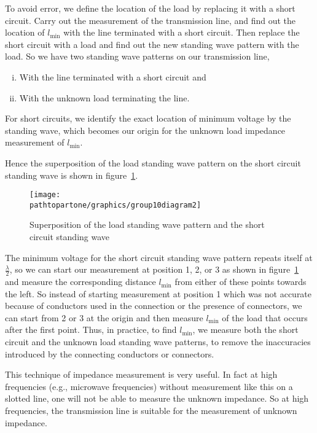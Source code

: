 To avoid error, we define the location of the load by replacing it with a short circuit. Carry out the measurement of the transmission line, and find out the location of $l_\min$ with the line terminated with a short circuit. Then replace the short circuit with a load and find out the new standing wave pattern with the load. So we have two standing wave patterns on our transmission line,
\begin{enumerate}[(i)]
\item With the line terminated with a short circuit and 
\item With the unknown load terminating the line.
\end{enumerate}
For short circuits, we identify the exact location of minimum voltage by the standing wave, which becomes our origin for the unknown load impedance measurement of $l_\min$.

Hence the superposition of the load standing wave pattern on the short circuit standing wave is shown in figure~\ref{fig:group10diagram2}.
\begin{figure}[h]
\centering
\texttt{[image: \\pathtopartone/graphics/group10diagram2]}
\caption{Superposition of the load standing wave pattern and the short circuit standing wave}
\label{fig:group10diagram2}
\end{figure}

The minimum voltage for the short circuit standing wave pattern repeats itself at $\frac{\lambda}{2}$, so we can start our measurement at position 1, 2, or 3 as shown in figure~\ref{fig:group10diagram2} and measure the corresponding distance $l_\min$ from either of these points towards the left. So instead of starting measurement at position 1 which was not accurate because of conductors used in the connection or the presence of connectors, we can start from 2 or 3 at the origin and then measure $l_\min$ of the load that occurs after the first point. Thus, in practice, to find $l_\min$, we measure both the short circuit and the unknown load standing wave patterns, to remove the inaccuracies introduced by the connecting conductors or connectors.

This technique of impedance measurement is very useful. In fact at high frequencies (e.g., microwave frequencies) without measurement like this on a slotted line, one will not be able to measure the unknown impedance. So at high frequencies, the transmission line is suitable for the measurement of unknown impedance.

